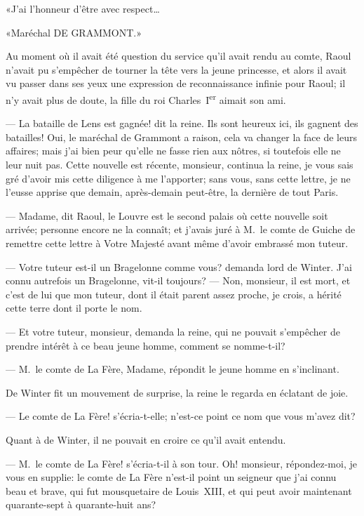 «J'ai l'honneur d'être avec respect\dots

«Maréchal DE GRAMMONT.»

Au moment où il avait été question du service qu'il avait rendu au comte, Raoul n'avait pu s'empêcher de tourner la tête vers la jeune princesse, et alors il avait vu passer dans ses yeux une expression de reconnaissance infinie pour Raoul; il n'y avait plus de doute, la fille du roi Charles~I\textsuperscript{er} aimait son ami.

— La bataille de Lens est gagnée! dit la reine. Ils sont heureux ici, ils gagnent des batailles! Oui, le maréchal de Grammont a raison, cela va changer la face de leurs affaires; mais j'ai bien peur qu'elle ne fasse rien aux nôtres, si toutefois elle ne leur nuit pas. Cette nouvelle est récente, monsieur, continua la reine, je vous sais gré d'avoir mis cette diligence à me l'apporter; sans vous, sans cette lettre, je ne l'eusse apprise que demain, après-demain peut-être, la dernière de tout Paris.

— Madame, dit Raoul, le Louvre est le second palais où cette nouvelle soit arrivée; personne encore ne la connaît; et j'avais juré à M.~le comte de Guiche de remettre cette lettre à Votre Majesté avant même d'avoir embrassé mon tuteur.

— Votre tuteur est-il un Bragelonne comme vous? demanda lord de Winter. J'ai connu autrefois un Bragelonne, vit-il toujours?
— Non, monsieur, il est mort, et c'est de lui que mon tuteur, dont il était parent assez proche, je crois, a hérité cette terre dont il porte le nom.

— Et votre tuteur, monsieur, demanda la reine, qui ne pouvait s'empêcher de prendre intérêt à ce beau jeune homme, comment se nomme-t-il?

— M.~le comte de La Fère, Madame, répondit le jeune homme en s'inclinant.

De Winter fit un mouvement de surprise, la reine le regarda en éclatant de joie.

— Le comte de La Fère! s'écria-t-elle; n'est-ce point ce nom que vous m'avez dit?

Quant à de Winter, il ne pouvait en croire ce qu'il avait entendu.

— M.~le comte de La Fère! s'écria-t-il à son tour. Oh! monsieur, répondez-moi, je vous en supplie: le comte de La Fère n'est-il point un seigneur que j'ai connu beau et brave, qui fut mousquetaire de Louis~XIII, et qui peut avoir maintenant quarante-sept à quarante-huit ans?


